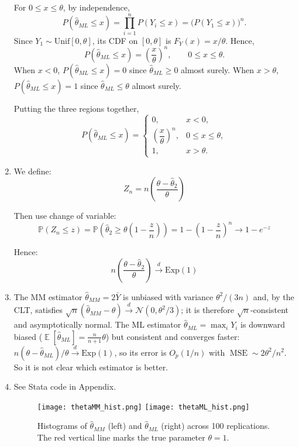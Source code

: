 \documentclass[12pt]{article}
\DeclareMathOperator{\E}{\mathbb{E}}
\DeclareMathOperator{\MSE}{MSE}
\begin{document}
\begin{flushleft}
\begin{enumerate}[label=(\alph*)]
For $0\le x\le \theta$, by independence,
\[
P(\hat\theta_{ML} \le x)
= \prod_{i=1}^n P(Y_i \le x)
= \big(P(Y_1 \le x)\big)^n.
\]
Since $Y_1 \sim \mathrm{Unif}[0,\theta]$, its CDF on $[0,\theta]$ is $F_{Y}(x)=x/\theta$. Hence,
\[
P(\hat\theta_{ML} \le x) = \left(\frac{x}{\theta}\right)^n,\qquad 0\le x\le \theta.
\]
When $x<0$, $P(\hat\theta_{ML} \le x)=0$ since $\hat\theta_{ML}\ge 0$ almost surely. When $x>\theta$, $P(\hat\theta_{ML} \le x)=1$ since $\hat\theta_{ML}\le \theta$ almost surely.


Putting the three regions together,
\[
P(\hat\theta_{ML} \le x)
=
\begin{cases}
0, & x<0,\\[6pt]
\left(\dfrac{x}{\theta}\right)^n, & 0\le x \le \theta,\\[10pt]
1, & x>\theta.
\end{cases}
\]
\item

We define:
\[
Z_n = n \left( \frac{\theta - \hat{\theta}_2}{\theta} \right)
\]

Then use change of variable:
\[
\mathbb{P}(Z_n \leq z) = \mathbb{P}\left( \hat{\theta}_2 \geq \theta \left(1 - \frac{z}{n} \right) \right) = 1 - \left(1 - \frac{z}{n} \right)^n \to 1 - e^{-z}
\]

Hence:
\[
n \left( \frac{\theta - \hat{\theta}_2}{\theta} \right) \xrightarrow{d} \text{Exp}(1)
\]

\item 
The MM estimator $\hat\theta_{MM}=2\bar Y$ is unbiased with variance $\theta^2/(3n)$ and, by the CLT, satisfies $\sqrt{n}(\hat\theta_{MM}-\theta)\xrightarrow{d}\mathcal N(0,\theta^2/3)$; it is therefore $\sqrt{n}$-consistent and asymptotically normal. The ML estimator $\hat\theta_{ML}=\max_i Y_i$ is downward biased ($\E[\hat\theta_{ML}]=\tfrac{n}{n+1}\theta$) but consistent and converges faster: $n(\theta-\hat\theta_{ML})/\theta \xrightarrow{d}\mathrm{Exp}(1)$, so its error is $O_p(1/n)$ with $\MSE\sim 2\theta^2/n^2$. So it is not clear which estimator is better.
\item See Stata code in Appendix.
\begin{figure}[h!]
    \centering
    \texttt{[image: thetaMM\_hist.png]}
    \texttt{[image: thetaML\_hist.png]}
    \caption{Histograms of $\hat\theta_{MM}$ (left) and $\hat\theta_{ML}$ (right) across 100 replications. 
    The red vertical line marks the true parameter $\theta=1$.}
    \label{fig:mmml}
\end{figure}


\end{enumerate}
\end{flushleft}
\end{document}
